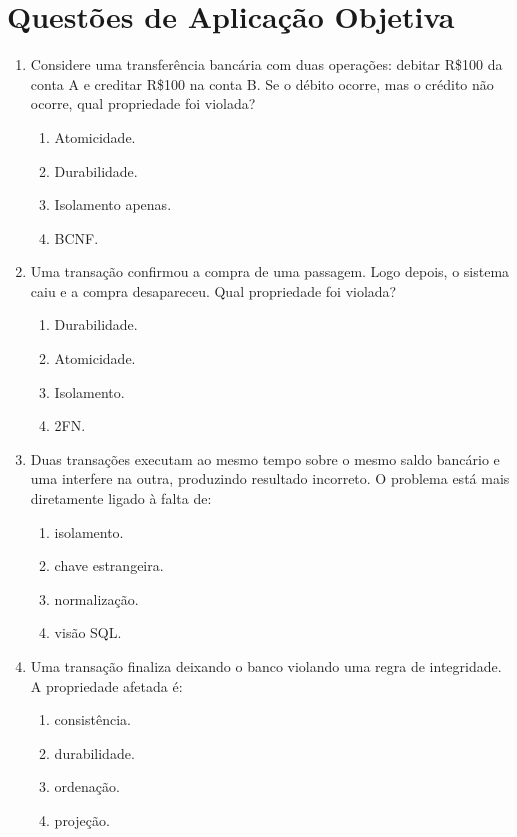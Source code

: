 \documentclass[12pt,a4paper]{article}
\begin{document}
\section{Questões de Aplicação Objetiva}

\begin{enumerate}[resume,label=\textbf{Q\arabic*.}]

\item Considere uma transferência bancária com duas operações: debitar R\$100 da conta A e creditar R\$100 na conta B. Se o débito ocorre, mas o crédito não ocorre, qual propriedade foi violada?

\begin{enumerate}[label=\alph*)]
    \item Atomicidade.
    \item Durabilidade.
    \item Isolamento apenas.
    \item BCNF.
\end{enumerate}

\item Uma transação confirmou a compra de uma passagem. Logo depois, o sistema caiu e a compra desapareceu. Qual propriedade foi violada?

\begin{enumerate}[label=\alph*)]
    \item Durabilidade.
    \item Atomicidade.
    \item Isolamento.
    \item 2FN.
\end{enumerate}

\item Duas transações executam ao mesmo tempo sobre o mesmo saldo bancário e uma interfere na outra, produzindo resultado incorreto. O problema está mais diretamente ligado à falta de:

\begin{enumerate}[label=\alph*)]
    \item isolamento.
    \item chave estrangeira.
    \item normalização.
    \item visão SQL.
\end{enumerate}

\item Uma transação finaliza deixando o banco violando uma regra de integridade. A propriedade afetada é:

\begin{enumerate}[label=\alph*)]
    \item consistência.
    \item durabilidade.
    \item ordenação.
    \item projeção.
\end{enumerate}


\end{enumerate}
\end{document}
